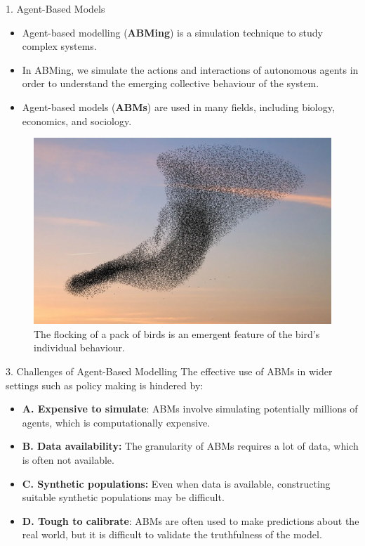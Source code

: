 \documentclass[final,hyperref={pdfpagelabels=false}]{beamer}
\newcommand{\shrink}{-15pt}
\begin{document}
\begin{frame}[t]
\begin{columns}[t]
\begin{column}{.48\textwidth}
    \vspace{\shrink}          
    \begin{block}{1. Agent-Based Models}
      \begin{itemize}
          \item Agent-based modelling (\textbf{ABMing}) is a simulation technique to study complex systems.
          \item In ABMing, we simulate the actions and interactions of autonomous agents in order to understand the emerging collective behaviour of the system.
          \item Agent-based models (\textbf{ABMs}) are used in many fields, including biology, economics, and sociology.
      \end{itemize}
      \begin{figure}
        \centering
        \includegraphics[width=0.7\columnwidth]{figures/birds}
        \caption{\footnotesize The flocking of a pack of birds is an emergent feature of the bird's individual behaviour.}
      \end{figure}
    \end{block}
    \begin{block}{3. Challenges of Agent-Based Modelling}
      The effective use of ABMs in wider settings such as policy making is hindered by:
      \begin{itemize}
        \item\justifying \textbf{A. Expensive to simulate}: ABMs involve simulating potentially millions of agents, which is computationally expensive.
        \item\justifying \textbf{B. Data availability:} The granularity of ABMs requires a lot of data, which is often not available. 
        \item \justifying \textbf{C. Synthetic populations: } Even when data is available, constructing suitable synthetic populations may be difficult.
        \item\justifying\textbf{D. Tough to calibrate}: ABMs are often used to make predictions about the real world, but it is difficult to validate the truthfulness of the model.

\end{itemize}
\end{block}
\end{column}
\end{columns}
\end{frame}
\end{document}
